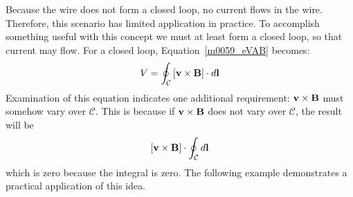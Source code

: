 Because the wire does not form a closed loop, no current flows in the wire.
Therefore, this scenario has limited application in practice.
To accomplish something useful with this concept we must at least form a closed loop, so that current may flow.
For a closed loop, Equation~\ref{m0059_eVAB} becomes:
%
\begin{equation}
V = \oint_{\mathcal C} \left[ {\bf v} \times {\bf B} \right] \cdot d{\bf l}
\label{m0059_eVABc}
\end{equation}
%
Examination of this equation indicates one additional requirement: ${\bf v} \times {\bf B}$ must somehow vary over $\mathcal{C}$.
This is because if ${\bf v} \times {\bf B}$ does not vary over $\mathcal{C}$, the result will be
%
\begin{equation}
\left[ {\bf v} \times {\bf B} \right] \cdot \oint_{\mathcal C} d{\bf l}  \nonumber
\end{equation}
%
which is zero because the integral is zero.
The following example demonstrates a practical application of this idea.


